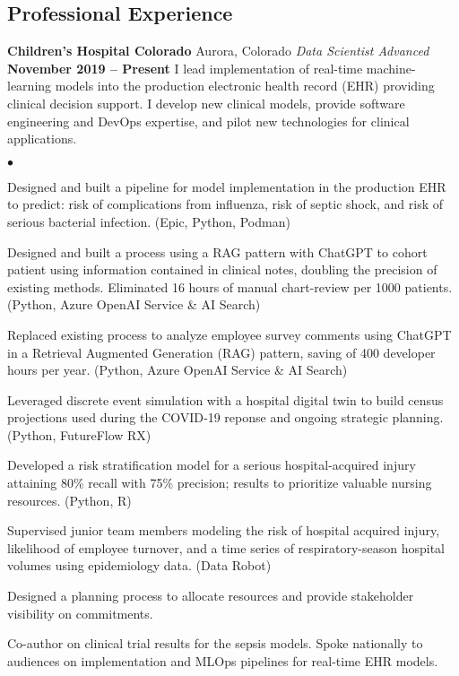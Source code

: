 \documentclass[margin,line, 11pt]{res}
\newenvironment{list2}{
  \begin{list}{$\bullet$}{%
      \setlength{\itemsep}{0in}
      \setlength{\parsep}{0in} \setlength{\parskip}{0in}
      \setlength{\topsep}{0in} \setlength{\partopsep}{0in}
      \setlength{\leftmargin}{0.2in}}}{\end{list}}
\begin{document}
\begin{resume}
\section{Professional \newline Experience}
\textbf{Children's Hospital Colorado} \hfill Aurora, Colorado\newline
\textit{Data Scientist Advanced} \hfill \textbf{November 2019 -- Present}\newline
I lead implementation of real-time machine-learning models into the production electronic health record (EHR) providing clinical decision support. I develop new clinical models, provide software engineering and DevOps expertise, and pilot new technologies for clinical applications.
    \begin{list2}
      \item Designed and built a pipeline for model implementation in the production EHR to predict: risk of complications from influenza, risk of septic shock, and risk of serious bacterial infection. (Epic, Python, Podman)
      \item Designed and built a process using a RAG pattern with ChatGPT to cohort patient using information contained in clinical notes, doubling the precision of existing methods. Eliminated 16 hours of manual chart-review per 1000 patients. (Python, Azure OpenAI Service \& AI Search)
      \item Replaced existing process to analyze employee survey comments using ChatGPT in a Retrieval Augmented Generation (RAG) pattern, saving of 400 developer hours per year. (Python, Azure OpenAI Service \& AI Search)
      \item Leveraged discrete event simulation with a hospital digital twin to build census projections used during the COVID‑19 reponse and ongoing strategic planning. (Python, FutureFlow RX)
      \item Developed a risk stratification model for a serious hospital-acquired injury attaining 80\% recall with 75\% precision; results to prioritize valuable nursing resources. (Python, R)
      \item Supervised junior team members modeling the risk of hospital acquired injury, likelihood of employee turnover, and a time series of respiratory-season hospital volumes using epidemiology data. (Data Robot)
      \item Designed a planning process to allocate resources and provide stakeholder visibility on commitments.
      \item Co-author on clinical trial results for the sepsis models. Spoke nationally to audiences on implementation and MLOps pipelines for real-time EHR models.
    \end{list2}
\vspace*{-2mm}


\end{resume}
\end{document}
